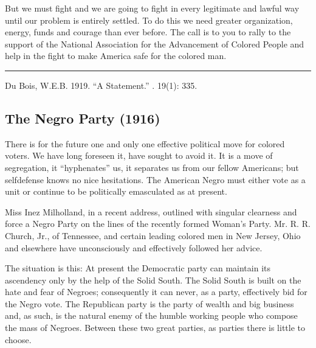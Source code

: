 \documentclass[letterpaper,10pt,english]{jupyterBook}
\begin{document}
\sphinxAtStartPar
But we must fight and we are going to fight in every legitimate and lawful way until our problem is entirely settled. To do this we need greater organization, energy, funds and courage than ever before. The call is to you to rally to the support of the National Association for the Advancement of Colored People and help in the fight to make America safe for the colored man.


\bigskip\hrule\bigskip


\sphinxAtStartPar
{} Du Bois, W.E.B. 1919. “A Statement.” . 19(1): 335.


\subsection{The Negro Party (1916)}
\label{\detokenize{Volumes/12/06/negro_party:the-negro-party-1916}}\label{\detokenize{Volumes/12/06/negro_party::doc}}
\sphinxAtStartPar
There is for the future one and only one effective political move for colored voters. We have long foreseen it, have sought to avoid it. It is a move of segregation, it “hyphenates” us, it separates us from our fellow Americans; but self\sphinxhyphen{}defense knows no nice hesitations. The American Negro must either vote as a unit or continue to be politically emasculated as at present.

\begin{sphinxShadowBox}
\sphinxstylesidebartitle{}

\sphinxAtStartPar
{}
\end{sphinxShadowBox}

\sphinxAtStartPar
Miss Inez Milholland, in a recent address, outlined with singular clearness and force a Negro Party on the lines of the recently formed Woman’s Party. Mr. R. R. Church, Jr., of Tennessee, and certain leading colored men in New Jersey, Ohio and elsewhere have unconsciously and effectively followed her advice.

\sphinxAtStartPar
The situation is this: At present the Democratic party can maintain its ascendency only by the help of the Solid South. The Solid South is built on the hate and fear of Negroes; consequently it can never, as a party, effectively bid for the Negro vote. The Republican party is the party of wealth and big business and, as such, is the natural enemy of the humble working people who compose the mass of Negroes. Between these two great parties, as parties there is little to choose.
\end{document}
